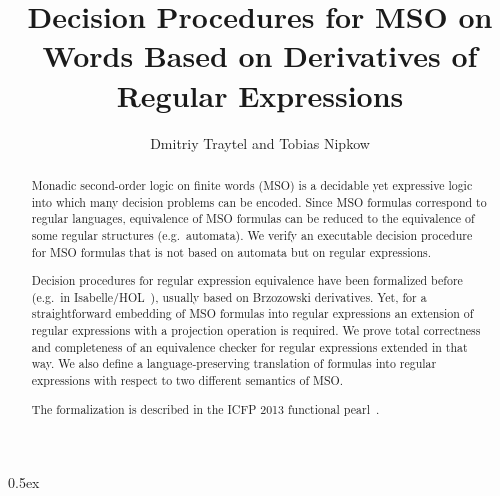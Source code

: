 \documentclass[11pt,a4paper]{article}
\begin{document}
\title{Decision Procedures for MSO on Words Based on Derivatives of Regular Expressions}
\author{Dmitriy Traytel and Tobias Nipkow}
\maketitle

\begin{abstract}
  Monadic second-order logic on finite words (MSO) is a decidable yet expressive
  logic into which many decision problems can be encoded. Since MSO formulas
  correspond to regular languages, equivalence of MSO formulas can be reduced to
  the equivalence of some regular structures (e.g.\ automata). We verify an
  executable decision procedure for MSO formulas that is not based on automata
  but on regular expressions.

  Decision procedures for regular expression equivalence have been formalized
  before (e.g.\ in Isabelle/HOL~\cite{KraussN-AFP}), usually based on Brzozowski
  derivatives. Yet, for a straightforward embedding of MSO formulas into regular
  expressions an extension of regular expressions with a projection operation is
  required. We prove total correctness and completeness of an equivalence
  checker for regular expressions extended in that way. We also define a
  language-preserving translation of formulas into regular expressions with
  respect to two different semantics of MSO.

  The formalization is described in the ICFP 2013 functional
  pearl~\cite{TraytelN-ICFP13}.
\end{abstract}

\tableofcontents

\parindent 0pt\parskip 0.5ex





\end{document}
